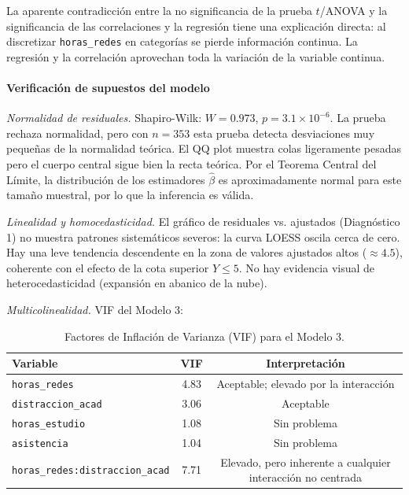 \documentclass[12pt]{article}
\begin{document}
La aparente contradicción entre la no significancia de la prueba \(t\)/ANOVA y la significancia de las correlaciones y la regresión tiene una explicación directa: al discretizar \texttt{horas\_redes} en categorías se pierde información continua. La regresión y la correlación aprovechan toda la variación de la variable continua.

\paragraph{Verificación de supuestos del modelo}

\textit{Normalidad de residuales.} Shapiro-Wilk: \(W = 0.973\), \(p = 3.1 \times 10^{-6}\). La prueba rechaza normalidad, pero con \(n = 353\) esta prueba detecta desviaciones muy pequeñas de la normalidad teórica. El QQ plot muestra colas ligeramente pesadas pero el cuerpo central sigue bien la recta teórica. Por el Teorema Central del Límite, la distribución de los estimadores \(\hat\beta\) es aproximadamente normal para este tamaño muestral, por lo que la inferencia es válida.

\textit{Linealidad y homocedasticidad.} El gráfico de residuales vs. ajustados (Diagnóstico 1) no muestra patrones sistemáticos severos: la curva LOESS oscila cerca de cero. Hay una leve tendencia descendente en la zona de valores ajustados altos (\(\approx 4.5\)), coherente con el efecto de la cota superior \(Y \leq 5\). No hay evidencia visual de heterocedasticidad (expansión en abanico de la nube).

\textit{Multicolinealidad.} VIF del Modelo 3:

\begin{table}[H]
\centering
\caption{Factores de Inflación de Varianza (VIF) para el Modelo 3.}
\begin{tabular}{lcc}
\toprule
Variable & VIF & Interpretación \\
\midrule
\texttt{horas\_redes} & 4.83 & Aceptable; elevado por la interacción \\
\texttt{distraccion\_acad} & 3.06 & Aceptable \\
\texttt{horas\_estudio} & 1.08 & Sin problema \\
\texttt{asistencia} & 1.04 & Sin problema \\
\texttt{horas\_redes:distraccion\_acad} & 7.71 & Elevado, pero inherente a cualquier interacción no centrada \\
\bottomrule
\end{tabular}
\label{tab:vif_modelo3}
\end{table}
\end{document}
